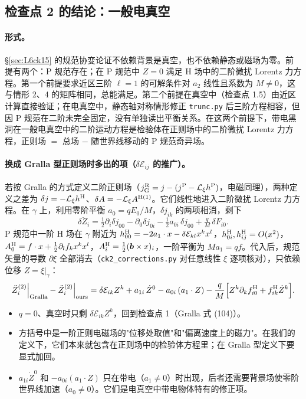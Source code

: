\documentclass[11pt,a4paper]{ctexart}
\numberwithin{equation}{section}
\begin{document}
\subsection{检查点 2 的结论：一般电真空}
\label{sec:L6ck2concl}

\paragraph{形式。}\S\ref{sec:L6ck15} 的规范协变论证不依赖背景是真空，也不依赖静态或磁场为零。前提有两个：P 规范存在；在 P 规范中 $Z=0$ 满足 H 场中的二阶微扰 Lorentz 力方程。第一个前提要求近区三阶 $\ell=1$ 的可解条件对 $a_2$ 线性且系数为 $M\ne0$，这与情形 2、4 的矩阵相同，总能满足。第二个前提在真空中（检查点 1.5）由近区计算直接验证；在电真空中，静态轴对称情形修正 \texttt{trunc.py} 后三阶方程相容，但因 P 规范在二阶未完全固定，没有单独读出平衡关系。在这两个前提下，带电黑洞在一般电真空中的二阶运动方程是检验体在正则场中的二阶微扰 Lorentz 力方程，正则场 $=$ 总场 $-$ 随世界线移动的 P 规范奇异场。

\paragraph{换成 Gralla 型正则场时多出的项（$\delta\mathcal E_{ij}$ 的推广）。}若按 Gralla 的方式定义二阶正则场（$j^{\rm R}_{\rm G}=j-(j^{\rm P}-\mathcal L_\xi h^{\rm P})$，电磁同理），两种定义之差为 $\delta j=-\mathcal L_\xi h^{\rm H}$、$\delta A=-\mathcal L_\xi A^{\rm H(1)}$。它们线性地进入二阶微扰 Lorentz 力方程。在 $\gamma$ 上，利用零阶平衡 $a_0=qE_0/M$，$\delta j_{ik}$ 的两项相消，剩下
\begin{equation*}
\delta\ddot Z_i=\tfrac12\partial_i\delta j_{00}-\partial_0\delta j_{0i}-\tfrac12a_{0i}\,\delta j_{00}+\tfrac qM\,\delta F_{i0}.
\end{equation*}
P 规范中一阶 H 场在 $\gamma$ 附近为 $h^{\rm H}_{00}=-2a_1\cdot x-\delta\mathcal E_{kl}x^kx^l$，$h^{\rm H}_{0i},h^{\rm H}_{ij}=O(x^2)$，$A^{\rm H}_0=f\cdot x+\tfrac12\partial_lf_kx^kx^l$，$A^{\rm H}_i=\tfrac12(\boldsymbol b\times x)_i$，一阶平衡为 $Ma_1=qf$。代入后，规范矢量的导数 $\partial\xi$ 全部消去（\texttt{ck2\_corrections.py} 对任意线性 $\xi$ 逐项核对），只依赖位移 $Z=\xi|_\gamma$：
\begin{equation}
\ddot Z^{(2)}_i\Big|_{\rm Gralla}-\ddot Z^{(2)}_i\Big|_{\rm ours}
=\delta\mathcal E_{ik}Z^k+a_{1i}\,\dot Z^0-a_{0i}\,(a_1\cdot Z)-\frac qM\Big[Z^k\partial_kf^{\rm H}_{i0}+f^{\rm H}_{ik}\dot Z^k\Big].
\label{eq:ck2C}
\end{equation}
\begin{itemize}
\item $q=0$、真空时只剩 $\delta\mathcal E_{ik}Z^k$，回到检查点 1（Gralla 式 (104)）。
\item 方括号中是一阶正则电磁场的"位移处取值"和"偏离速度上的磁力"。在我们的定义下，它们本来就包含在正则场中的检验体方程里；在 Gralla 型定义下要显式加回。
\item $a_{1i}\dot Z^0$ 和 $-a_{0i}(a_1\cdot Z)$ 只在带电（$a_1\neq0$）时出现，后者还需要背景场使零阶世界线加速（$a_0\neq0$）。它们是电真空中带电物体特有的修正项。
\end{itemize}
\end{document}
